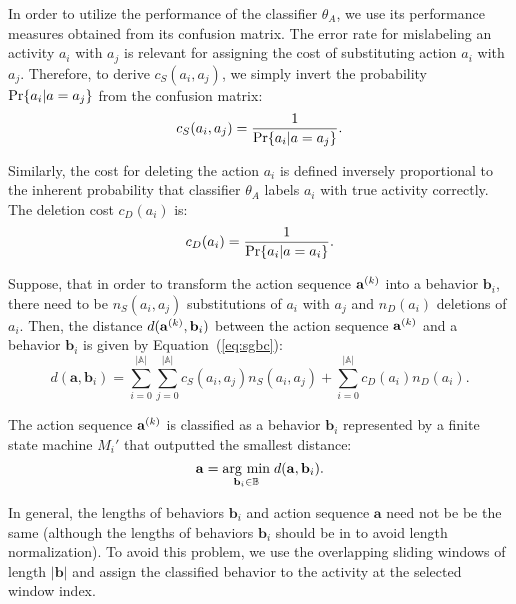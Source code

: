 In order to utilize the performance of the classifier $\theta_A$, we use its performance measures obtained from its confusion matrix. The error rate for mislabeling an activity $a_i$ with $a_j$ is relevant for assigning the cost of substituting action $a_i$ with $a_j$. Therefore, to derive $c_S(a_i, a_j)$, we simply invert the probability $\text{Pr}\{a_i|a=a_j\}$ from the confusion matrix:
\begin{equation}
\label{eq:sgbc}
c_S(a_i, a_j) = \frac{1}{\text{Pr}\{a_i|a=a_j\}}.
\end{equation}

Similarly, the cost for deleting the action $a_i$ is defined inversely proportional to the inherent probability that classifier $\theta_A$ labels $a_i$ with true activity correctly. The deletion cost $c_D(a_i)$ is:
\begin{equation}
\label{eq:sgbc}
c_D(a_i) = \frac{1}{\text{Pr}\{a_i|a=a_i\}}.
\end{equation}

Suppose, that in order to transform the action sequence $\mathbf{a}^{\scriptsize(k)}$ into a behavior $\mathbf{b}_i$, there need to be $n_S(a_i, a_j)$ substitutions of $a_i$ with $a_j$ and $n_D(a_i)$ deletions of $a_i$. Then, the distance $d(\mathbf{a}^{\scriptsize(k)}, \mathbf{b}_i)$ between the action sequence $\mathbf{a}^{\scriptsize(k)}$ and a behavior $\mathbf{b}_i$ is given by Equation~(\ref{eq:sgbc}):
\begin{equation}
\label{eq:sgbc}
d(\mathbf{a}, \mathbf{b}_i) = \sum_{i=0}^{|\mathbb{A}|} \sum_{j=0}^{|\mathbb{A}|} c_S(a_i, a_j) n_S(a_i, a_j) + \sum_{i=0}^{|\mathbb{A}|} c_D(a_i) n_D(a_i).
\end{equation}

The action sequence $\mathbf{a}^{\scriptsize(k)}$ is classified as a behavior $\mathbf{b}_i$ represented by a finite state machine $M_i'$ that outputted the smallest distance:
\begin{equation}
\label{eq:sgbc-argmin}
\mathbf{a} = \underset{\mathbf{b}_i \in \mathbb{B}}{\operatorname{arg}\,\operatorname{min}}\; d(\mathbf{a}, \mathbf{b}_i).
\end{equation}

In general, the lengths of behaviors $\mathbf{b}_i$ and action sequence $\mathbf{a}$ need not be be the same (although the lengths of behaviors $\mathbf{b}_i$ should be in to avoid length normalization). 
To avoid this problem,
we use the overlapping sliding windows of length $|\mathbf{b}|$ and assign the classified behavior to the activity at the selected window index.



